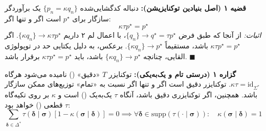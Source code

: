 \textbf{قضیه ۱ (اصل بنیادین توکنایزیشن):}
دنباله کدگشایی‌شده $\{p_n = \kappa q_n\}$ یک برآوردگر سازگار برای $p^\star$ است اگر و تنها اگر:
\begin{equation}
    \kappa \tau p^\star = p^\star
\end{equation}
\textit{اثبات:}
از آنجا که طبق فرض $\{q_n\} \to q^\star = \tau p^\star$، با اعمال لم ۲ داریم $\{\kappa q_n\} \to \kappa \tau p^\star$. اگر $\kappa \tau p^\star = p^\star$ باشد، مستقیماً $\{\kappa q_n\} \to p^\star$. برعکس، به دلیل یکتایی حد در توپولوژی القایی، چنانچه $\{\kappa q_n\} \to p^\star$ باشد، باید $\kappa \tau p^\star = p^\star$ برقرار باشد. $\blacksquare$

\textbf{گزاره ۱ (درستی تام و یک‌به‌یکی):}
توکنایزر $T$ «دقیق» () نامیده می‌شود هرگاه $\kappa \tau = \mathrm{id}_{\Sigma^*}$. توکنایزر دقیق است اگر و تنها اگر نسبت به «تمام» توزیع‌های ممکن سازگار باشد. همچنین، اگر توکنایزری دقیق باشد، آنگاه $\tau$ یک‌به‌یک () است و $\kappa$ بر روی تکیه‌گاه $\tau$ قطعی () خواهد بود:
\begin{equation}
    \sum_{\boldsymbol{\delta} \in \Delta^*} \tau(\boldsymbol{\delta} \mid \boldsymbol{\sigma}) [1 - \kappa(\boldsymbol{\sigma} \mid \boldsymbol{\delta})] = 0 \implies \forall \boldsymbol{\delta} \in \text{supp}(\tau(\cdot \mid \boldsymbol{\sigma})): \quad \kappa(\boldsymbol{\sigma} \mid \boldsymbol{\delta}) = 1
\end{equation}

